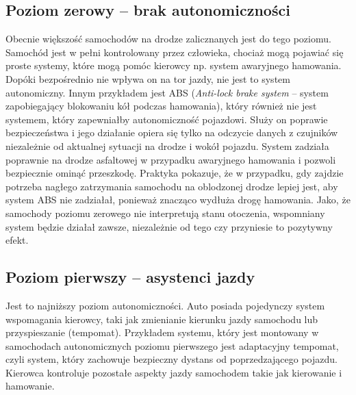 \subsection{Poziom zerowy -- brak autonomiczności}

Obecnie większość samochodów na drodze zalicznanych jest do tego poziomu. %
Samochód jest w pełni kontrolowany przez człowieka, chociaż mogą pojawiać się proste systemy, które mogą pomóc kierowcy np. system awaryjnego hamowania. 
Dopóki bezpośrednio nie wpływa on na tor jazdy, nie jest to system autonomiczny. 
Innym przykładem jest ABS (\textit{Anti-lock brake system} -- system zapobiegający blokowaniu kół podczas hamowania), który również nie jest systemem, który zapewniałby autonomiczność pojazdowi. %
Służy on poprawie bezpieczeństwa i jego działanie opiera się tylko na odczycie danych z czujników niezależnie od aktualnej sytuacji na drodze i wokół pojazdu. System zadziała poprawnie na drodze asfaltowej w przypadku awaryjnego hamowania i pozwoli bezpiecznie ominąć przeszkodę. Praktyka pokazuje, że w przypadku, gdy zajdzie potrzeba nagłego zatrzymania samochodu na oblodzonej drodze lepiej jest, aby system ABS nie zadziałał, ponieważ znacząco wydłuża drogę hamowania. Jako, że samochody poziomu zerowego nie interpretują stanu otoczenia, wspomniany system będzie działał zawsze, niezależnie od tego czy przyniesie to pozytywny efekt. %


\subsection{Poziom pierwszy -- asystenci jazdy}

Jest to najniższy poziom autonomiczności. 
Auto posiada pojedynczy system wspomagania kierowcy, taki jak zmienianie kierunku jazdy samochodu lub przyspieszanie (tempomat). 
Przykładem systemu, który jest montowany w samochodach autonomicznych poziomu pierwszego jest adaptacyjny tempomat, czyli system, który zachowuje bezpieczny dystans od poprzedzającego pojazdu. Kierowca kontroluje pozostałe aspekty jazdy samochodem takie jak kierowanie i hamowanie. %

